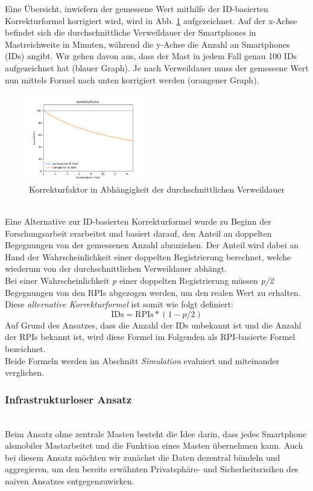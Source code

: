 \documentclass[conference,compsoc]{IEEEtran}
\begin{document}
Eine Übersicht, inwiefern der gemessene Wert mithilfe der ID-basierten Korrekturformel korrigiert wird, wird in Abb. \ref{cor_factor} aufgezeichnet. 
Auf der x-Achse befindet sich die durchschnittliche Verweildauer der Smartphones in Mastreichweite in Minuten, während die y-Achse die Anzahl an Smartphones (IDs) angibt.
Wir gehen davon aus, dass der Mast in jedem Fall genau 100 IDs aufgezeichnet hat (blauer Graph). Je nach Verweildauer muss der gemessene Wert nun mittels Formel nach unten korrigiert werden (orangener Graph).\\
\begin{figure}[h]
	\centering
	\includegraphics[width=0.45\textwidth]{"Korrekturfaktor"}
	\caption{Korrekturfaktor in Abhängigkeit der durchschnittlichen Verweildauer}
	\label{cor_factor}
\end{figure} \\
Eine Alternative zur ID-basierten Korrekturformel wurde zu Beginn der Forschungsarbeit erarbeitet und basiert darauf, den Anteil an doppelten Begegnungen von der gemessenen Anzahl abzuziehen. 
Der Anteil wird dabei an Hand der Wahrscheinlichkeit einer doppelten Registrierung berechnet, welche wiederum von der durchschnittlichen Verweildauer abhängt.\\
Bei einer Wahrscheinlichkeit \textit{p} einer doppelten Registrierung müssen \textit{p/2} Begegnungen von den RPIs abgezogen werden, um den realen Wert zu erhalten.\\
Diese \textit{alternative Korrekturformel} ist somit wie folgt definiert:
\begin{equation}
	\text{IDs} = \text{RPIs} * (1-p/2)
\end{equation}
Auf Grund des Ansatzes, dass die Anzahl der IDs unbekannt ist und die Anzahl der RPIs bekannt ist, wird diese Formel im Folgenden als RPI-basierte Formel bezeichnet.\\
Beide Formeln werden im Abschnitt \textit{Simulation} evaluiert und miteinander verglichen.\\

\subsubsection{Infrastrukturloser Ansatz}
\text{ }\\
Beim Ansatz ohne zentrale Masten besteht die Idee darin, dass jedes Smartphone als\glqq mobiler Mast\grqq arbeitet und die Funktion eines Masten übernehmen kann.
Auch bei diesem Ansatz möchten wir zunächst die Daten dezentral bündeln und aggregieren, um den bereits erwähnten Privatsphäre- und Sicherheitsrisiken des naiven Ansatzes entgegenzuwirken.  
\end{document}
